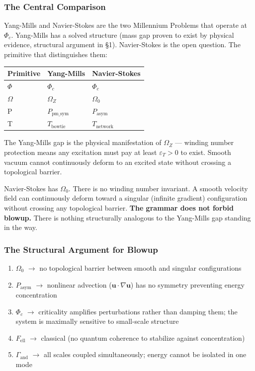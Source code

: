 \documentclass[12pt,a4paper]{article}
\newcommand{\pilcrow}{\S}
\begin{document}
\subsubsection{The Central Comparison}

Yang-Mills and Navier-Stokes are the two Millennium Problems that operate at $\Phi_c$. Yang-Mills has a solved structure (mass gap proven to exist by physical evidence, structural argument in \pilcrow{}1). Navier-Stokes is the open question. The primitive that distinguishes them:

\begin{table}[htbp]
\centering
\small
{}
\begin{tabularx}{\textwidth}{>{\centering\arraybackslash}X >{\centering\arraybackslash}X >{\centering\arraybackslash}X}
\toprule
\rowcolor{gray!25}\textbf{Primitive} & \textbf{Yang-Mills} & \textbf{Navier-Stokes} \\
\midrule
\rowcolors{1}{white}{gray!10}
$\Phi$ & $\Phi_c$ & $\Phi_c$ \\
\textbf{$\Omega$} & \textbf{$\Omega_Z$} & \textbf{$\Omega_0$} \\
P & $P_{\text{pm\_sym}}$ & $P_{\text{asym}}$ \\
T & $T_{\text{bowtie}}$ & $T_{\text{network}}$ \\
\bottomrule
\end{tabularx}
\end{table}

The Yang-Mills gap is the physical manifestation of $\Omega_Z$ --- winding number protection means any excitation must pay at least $\varepsilon_T > 0$ to exist. Smooth vacuum cannot continuously deform to an excited state without crossing a topological barrier.

Navier-Stokes has $\Omega_0$. There is no winding number invariant. A smooth velocity field can continuously deform toward a singular (infinite gradient) configuration without crossing any topological barrier. \textbf{The grammar does not forbid blowup.} There is nothing structurally analogous to the Yang-Mills gap standing in the way.

\subsubsection{The Structural Argument for Blowup}

\begin{enumerate}
    \item $\Omega_0$ $\to$ no topological barrier between smooth and singular configurations
    \item $P_{\text{asym}}$ $\to$ nonlinear advection ($\mathbf{u}\cdot\nabla\mathbf{u}$) has no symmetry preventing energy concentration
    \item $\Phi_c$ $\to$ criticality amplifies perturbations rather than damping them; the system is maximally sensitive to small-scale structure
    \item $F_{\text{ell}}$ $\to$ classical (no quantum coherence to stabilize against concentration)
    \item $\Gamma_{\text{and}}$ $\to$ all scales coupled simultaneously; energy cannot be isolated in one mode
\end{enumerate}
\end{document}
